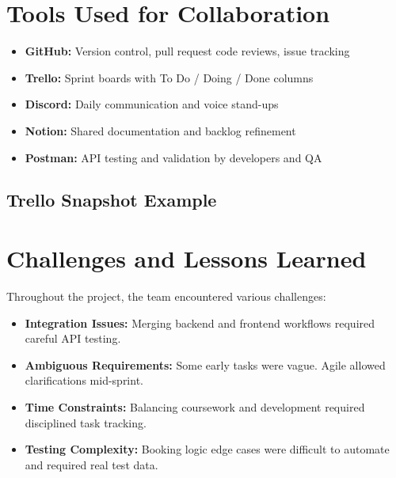 \documentclass[12pt,a4paper]{report}
\begin{document}
\section{Tools Used for Collaboration}

\begin{itemize}
    \item \textbf{GitHub:} Version control, pull request code reviews, issue tracking
    \item \textbf{Trello:} Sprint boards with To Do / Doing / Done columns
    \item \textbf{Discord:} Daily communication and voice stand-ups
    \item \textbf{Notion:} Shared documentation and backlog refinement
    \item \textbf{Postman:} API testing and validation by developers and QA
\end{itemize}

\subsection*{Trello Snapshot Example}


\section{Challenges and Lessons Learned}

Throughout the project, the team encountered various challenges:

\begin{itemize}
    \item \textbf{Integration Issues:} Merging backend and frontend workflows required careful API testing.
    \item \textbf{Ambiguous Requirements:} Some early tasks were vague. Agile allowed clarifications mid-sprint.
    \item \textbf{Time Constraints:} Balancing coursework and development required disciplined task tracking.
    \item \textbf{Testing Complexity:} Booking logic edge cases were difficult to automate and required real test data.
\end{itemize}
\end{document}
